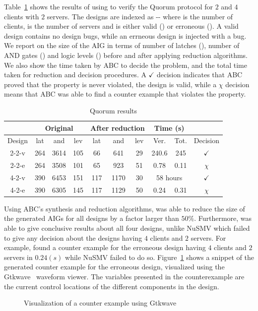 Table~\ref{tb:bip:qrm} shows the results of using \biptool{} to verify the 
Quorum protocol for $2$ and $4$ clients with $2$ servers. The designs
are indexed as -- where 
 is the number of clients,  is the number of 
servers and  is either valid () or erroneous ().
A valid design contains no design bugs, while an errneous design is injected
with a bug. We report on the size of the AIG in terms of number of latches (),
number of AND gates () and logic levels () before and after
applying reduction algorithms. We also show the time taken by ABC to decide the problem, 
and the total time taken for reduction and decision procedures. 
A $\checkmark$ decision indicates that ABC proved that the property is never 
violated, \ie{} the design is valid, while a $\chi$ decision means that 
ABC was able to find a counter example that violates the property. 

\begin{table}[bt]
\caption{Quorum results}
\centering
\begin{tabular}{|c|c|c|c|c|c|c|c|c|c|}
\cline{2-9}
\multicolumn{1}{c|}{} & \multicolumn{ 3}{c|}{Original} & \multicolumn{ 3}{c|}{After reduction} & \multicolumn{ 2}{c|}{Time (s)} & \multicolumn{1}{l}{} \\ \hline
Design & lat & and & lev & lat & and & lev & Ver. & Tot. & Decision \\ \hline
2-2-v & 264 & 3614 & 105 & 66 & 641 & 29 & 240.6 & 245 & $\checkmark$\\ \hline
2-2-e & 264 & 3508 & 101 & 65 & 923 & 51 & 0.78 & 0.11 & $\chi$\\ \hline
4-2-v & 390 & 6453 & 151 & 117 & 1170 & 30 & \multicolumn{2}{c|}{58 hours}& $\checkmark$\\ \hline
4-2-e & 390 & 6305 & 145 & 117 & 1129 & 50 & 0.24 & 0.31 & $\chi$ \\ \hline
\end{tabular}
\label{tb:bip:qrm}
\end{table}

Using ABC's synthesis and reduction algorithms, \biptool{} was able to
reduce the size of the generated AIGs for all designs by a factor larger
than $50\%$. Furthermore,
\biptool{} was able to give conclusive results about all four designs, unlike
NuSMV which failed to give any decision about the designs having
$4$ clients and $2$ servers. For example, \biptool{} found a counter example for the erroneous 
design having $4$ clients and $2$ servers in $0.24 (s)$ while NuSMV failed to do
so. Figure~\ref{fig:res:counter} shows a snippet of the generated counter example for the 
erroneous design, visualized using the Gtkwave~\cite{bybell2010gtkwave} waveform viewer. 
The variables presented in the counterexample are the current control locations of
the different components in the design. 

\begin{figure}[bt]
\centering
{}
\caption{Visualization of a counter example using Gtkwave}
\label{fig:res:counter}
\end{figure}